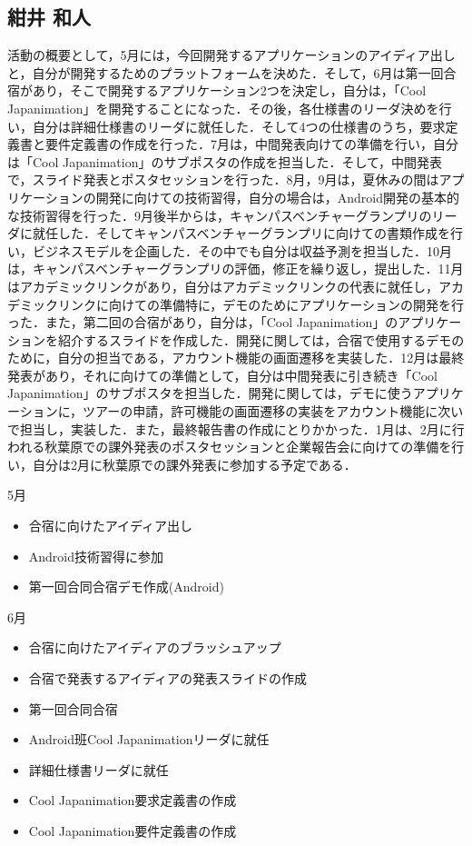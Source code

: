 \subsection{紺井 和人}
\par
活動の概要として，5月には，今回開発するアプリケーションのアイディア出しと，自分が開発するためのプラットフォームを決めた．そして，6月は第一回合宿があり，そこで開発するアプリケーション2つを決定し，自分は，「Cool Japanimation」を開発することになった．その後，各仕様書のリーダ決めを行い，自分は詳細仕様書のリーダに就任した．そして4つの仕様書のうち，要求定義書と要件定義書の作成を行った．7月は，中間発表向けての準備を行い，自分は「Cool Japanimation」のサブポスタの作成を担当した．そして，中間発表で，スライド発表とポスタセッションを行った．8月，9月は，夏休みの間はアプリケーションの開発に向けての技術習得，自分の場合は，Android開発の基本的な技術習得を行った．9月後半からは，キャンパスベンチャーグランプリのリーダに就任した．そしてキャンパスベンチャーグランプリに向けての書類作成を行い，ビジネスモデルを企画した．その中でも自分は収益予測を担当した．10月は，キャンパスベンチャーグランプリの評価，修正を繰り返し，提出した．11月はアカデミックリンクがあり，自分はアカデミックリンクの代表に就任し，アカデミックリンクに向けての準備特に，デモのためにアプリケーションの開発を行った．また，第二回の合宿があり，自分は，「Cool Japanimation」のアプリケーションを紹介するスライドを作成した．開発に関しては，合宿で使用するデモのために，自分の担当である，アカウント機能の画面遷移を実装した．12月は最終発表があり，それに向けての準備として，自分は中間発表に引き続き「Cool Japanimation」のサブポスタを担当した．開発に関しては，デモに使うアプリケーションに，ツアーの申請，許可機能の画面遷移の実装をアカウント機能に次いで担当し，実装した．また，最終報告書の作成にとりかかった．1月は、2月に行われる秋葉原での課外発表のポスタセッションと企業報告会に向けての準備を行い，自分は2月に秋葉原での課外発表に参加する予定である．
\par
5月
\begin{itemize}
\item 合宿に向けたアイディア出し
\item Android技術習得に参加
\item 第一回合同合宿デモ作成(Android)
\end{itemize}
6月
\begin{itemize}
\item 合宿に向けたアイディアのブラッシュアップ
\item 合宿で発表するアイディアの発表スライドの作成
\item 第一回合同合宿
\item Android班Cool Japanimationリーダに就任
\item 詳細仕様書リーダに就任
\item Cool Japanimation要求定義書の作成
\item Cool Japanimation要件定義書の作成
\end{itemize}
